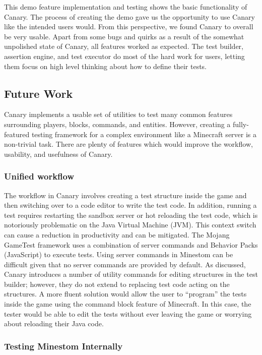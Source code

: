 \documentclass[12pt]{article}
\begin{document}
\begin{onehalfspacing}
This demo feature implementation and testing shows the basic
functionality of Canary. The process of creating the demo gave us the
opportunity to use Canary like the intended users would. From this
perspective, we found Canary to overall be very usable. Apart from some
bugs and quirks as a result of the somewhat unpolished state of Canary,
all features worked as expected. The test builder, assertion engine, and
test executor do most of the hard work for users, letting them focus on
high level thinking about how to define their tests.

\subsection{Future Work}

Canary implements a usable set of utilities to test many common features
surrounding players, blocks, commands, and entities. However, creating a
fully-featured testing framework for a complex environment like a
Minecraft server is a non-trivial task. There are plenty of features
which would improve the workflow, usability, and usefulness of Canary.

\subsubsection{Unified workflow}

The workflow in Canary involves creating a test structure inside the
game and then switching over to a code editor to write the test code. In
addition, running a test requires restarting the sandbox server or hot
reloading the test code, which is notoriously problematic on the Java
Virtual Machine (JVM). This context switch can cause a reduction in
productivity and can be mitigated. The Mojang GameTest framework uses a
combination of server commands and Behavior Packs (JavaScript) to
execute tests. Using server commands in Minestom can be difficult given
that no server commands are provided by default. As discussed, Canary
introduces a number of utility commands for editing structures in the
test builder; however, they do not extend to replacing test code acting
on the structures. A more fluent solution would allow the user to
``program'' the tests inside the game using the command block feature of
Minecraft. In this case, the tester would be able to edit the tests
without ever leaving the game or worrying about reloading their Java
code.

\subsubsection{Testing Minestom Internally}


\end{onehalfspacing}
\end{document}
